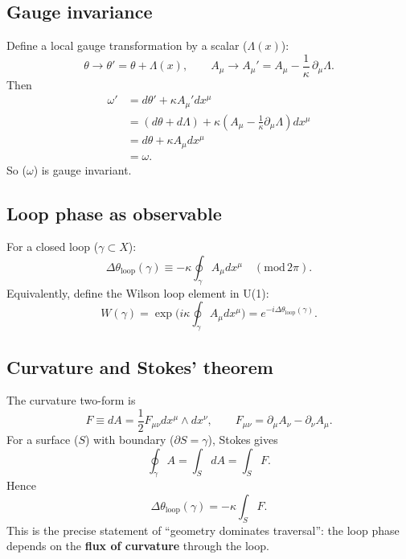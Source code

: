 ﻿\documentclass[twocolumn,aps,prd,nofootinbib]{revtex4-2}
\begin{document}
\subsection{Gauge invariance}
Define a local gauge transformation by a scalar ($\Lambda(x)$):
\begin{equation}
\theta \to \theta' = \theta + \Lambda(x),
\qquad
 A_\mu \to A_\mu' = A_\mu - \frac{1}{\kappa}\,\partial_\mu \Lambda.
\end{equation}
Then
\begin{align}
\omega' &= d\theta' + \kappa A_\mu' dx^\mu \\
&= (d\theta + d\Lambda) + \kappa\left(A_\mu - \frac{1}{\kappa}\partial_\mu\Lambda\right)dx^\mu \\
&= d\theta + \kappa A_\mu dx^\mu \\
&= \omega.
\end{align}
So ($\omega$) is gauge invariant.

\subsection{Loop phase as observable}
For a closed loop ($\gamma\subset X$):
\begin{equation}
\Delta\theta_{\mathrm{loop}}(\gamma)
\equiv -\kappa \oint_\gamma A_\mu dx^\mu
\quad (\mathrm{mod}\,2\pi).
\end{equation}
Equivalently, define the Wilson loop element in U(1):
\begin{equation}
W(\gamma) = \exp\Big(i\kappa\oint_\gamma A_\mu dx^\mu\Big) = e^{-i\Delta\theta_{\mathrm{loop}}(\gamma)}.
\end{equation}

\subsection{Curvature and Stokes' theorem}
The curvature two-form is
\begin{equation}
F \equiv dA = \frac{1}{2}F_{\mu\nu}dx^\mu\wedge dx^\nu,
\qquad
 F_{\mu\nu}=\partial_\mu A_\nu-\partial_\nu A_\mu.
\end{equation}
For a surface ($S$) with boundary ($\partial S = \gamma$), Stokes gives
\begin{equation}
\oint_\gamma A = \int_S dA = \int_S F.
\end{equation}
Hence
\begin{equation}
\Delta\theta_{\mathrm{loop}}(\gamma) = -\kappa\int_S F.
\end{equation}
This is the precise statement of ``geometry dominates traversal'': the loop phase depends on the \textbf{flux of curvature} through the loop.
\end{document}
